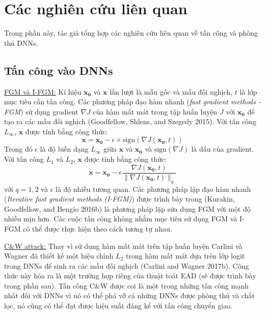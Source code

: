 \chapter{Các nghiên cứu liên quan}
Trong phần này, tác giả tổng hợp các nghiên cứu liên quan về tấn công và phòng thủ DNNs.

\section{Tấn công vào DNNs}
\underline{FGM và I-FGM:} Kí hiệu $\mathbf{x_0}$ và $\mathbf{x}$ lần lượt là mẫu gốc và mẫu đối nghịch,
$t$ là lớp mục tiêu cần tấn công. Các phương pháp đạo hàm nhanh (\textit{fast gradient 
methods - FGM}) sử dụng gradient $\nabla J$ của hàm mất mát trong tập huấn luyện $J$ với $\mathbf{x_0}$
để tạo ra các mẫu đối nghịch (Goodfellow, Shlens, and Szegedy 2015). Với tấn công $L_{\infty}$, 
$\mathbf{x}$ được tính bằng công thức:
\begin{equation}
    \mathbf{x} = \mathbf{x_0} - \epsilon \times \text{sign}(\nabla J(\mathbf{x_0}, t))
    \label{eq:1}
\end{equation}
Trong đó $\epsilon$ là độ biến dạng $L_{\infty}$ giữa $\mathbf{x}$ và $\mathbf{x_0}$ và 
$\text{sign}(\nabla J)$ là dấu của gradient. Với tấn công $L_1$ và $L_2$, $\mathbf{x}$ 
được tính bằng công thức:
\begin{equation}
    \mathbf{x} = \mathbf{x_0} - \epsilon \frac{\nabla J(\mathbf{x_0}, t)}
    {\lVert \nabla J(\mathbf{x_0}, t) \rVert _q}
    \label{eq:2}
\end{equation}
với $q = 1,2$ và $\epsilon$ là độ nhiễu tương quan. Các phương pháp lặp đạo hàm nhanh 
(\textit{Iterative fast gradient methods (I-FGM)}) được trình bày trong (Kurakin, Goodfellow, 
and Bengio 2016b) là phương pháp lặp sửa dụng FGM với một độ nhiễu mịn hơn. Các cuộc tấn công 
không nhắm mục tiêu sử dụng FGM và I-FGM có thể được thực hiện theo cách tương tự nhau. 

\underline{C\&W attack:} Thay vì sử dụng hàm mất mát trên tập huấn luyện Carlini và Wagner
đã thiết kế  một hiệu chỉnh $L_2$ trong hàm mất mát dựa trên lớp logit trong DNNs để sinh 
ra các mẫu đối nghịch (Carlini and Wagner 2017b). Công thức này hóa ra là một trường hợp riêng của 
thuật toát EAD (sẽ được trình bày trong phần sau). Tấn công C\&W được coi 
là một trong những tấn công mạnh nhất đối với DNNs vì nó có thể phá vỡ cả những DNNs được 
phòng thủ và chắt lọc, nó cũng có thể đạt được hiệu suất đáng kể với tấn công chuyển giao. 

